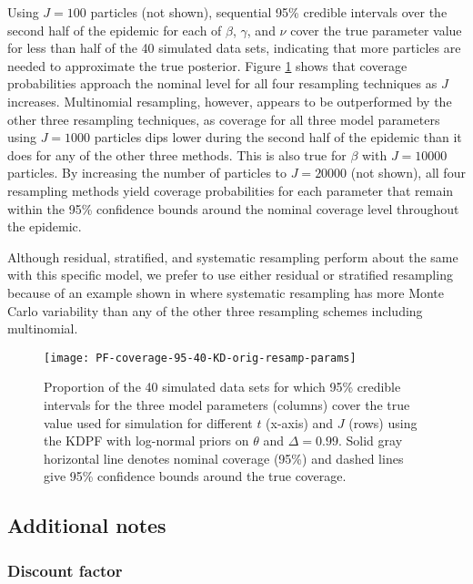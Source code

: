 \documentclass{elsarticle}
\begin{document}
Using $J = 100$ particles (not shown), sequential 95\% credible intervals over the second half of the epidemic for each of $\beta$, $\gamma$, and $\nu$ cover the true parameter value for less than half of the 40 simulated data sets, indicating that more particles are needed to approximate the true posterior. Figure \ref{fig:resamp} shows that coverage probabilities approach the nominal level for all four resampling techniques as $J$ increases. Multinomial resampling, however, appears to be outperformed by the other three resampling techniques, as coverage for all three model parameters using $J = 1000$ particles dips lower during the second half of the epidemic than it does for any of the other three methods. This is also true for $\beta$ with $J = 10000$ particles. By increasing the number of particles to $J = 20000$ (not shown), all four resampling methods yield coverage probabilities for each parameter that remain within the 95\% confidence bounds around the nominal coverage level throughout the epidemic.

Although residual, stratified, and systematic resampling perform about the same with this specific model, we prefer to use either residual or stratified resampling because of an example shown in \cite{Douc:Capp:Moul:comp:2005} where systematic resampling has more Monte Carlo variability than any of the other three resampling schemes including multinomial.

\begin{figure}
\centering
\texttt{[image: PF-coverage-95-40-KD-orig-resamp-params]}
\caption{Proportion of the 40 simulated data sets for which 95\% credible intervals for the three model parameters (columns) cover the true value used for simulation for different $t$ (x-axis) and $J$ (rows) using the KDPF with log-normal priors on $\theta$ and $\Delta = 0.99$. Solid gray horizontal line denotes nominal coverage (95\%) and dashed lines give 95\% confidence bounds around the true coverage.} \label{fig:resamp}
\end{figure}

\subsection{Additional notes \label{sec:issues}}

\subsubsection{Discount factor}
\end{document}
